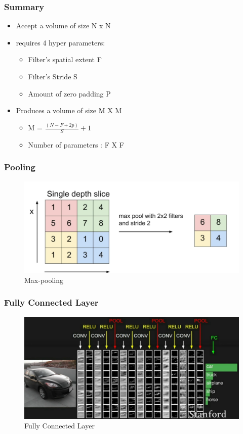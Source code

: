 \documentclass{beamer}
\begin{document}
\begin{frame}
\frametitle{Summary}
\begin{itemize}
	\item Accept a volume of size N x N 
	\item requires 4 hyper parameters:
	\begin{itemize}
		\item Filter's spatial extent F
		\item Filter's Stride S
		\item Amount of zero padding P
	\end{itemize}
	
     \item Produces a volume of size M X M
     \begin{itemize}
     	\item M = $ \frac{(N - F + 2p)}{S} + 1 $
     	\item Number of parameters : F X F
     \end{itemize}
\end{itemize}

\end{frame}
\begin{frame}
\frametitle{Pooling}

\begin{figure}
	\includegraphics[width=\linewidth]{Pics/pooling.png}
	\caption{Max-pooling}
\end{figure}

\end{frame}
\begin{frame}
\frametitle{Fully Connected Layer}

\begin{figure}
	\includegraphics[width=\linewidth]{Pics/cexample.png}
	\caption{Fully Connected Layer}
\end{figure}

\end{frame}
\end{document}
